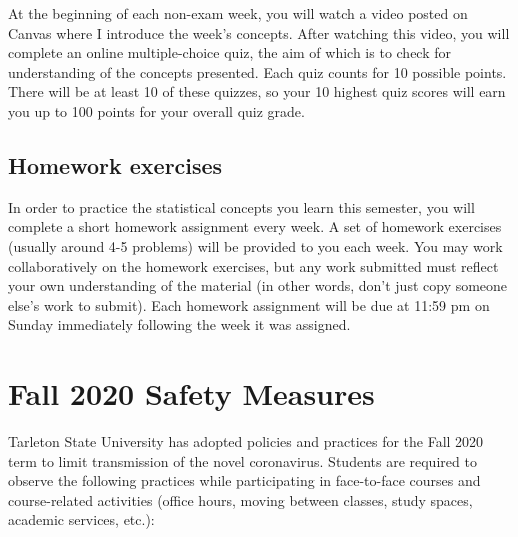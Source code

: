 \documentclass[10pt]{article}
\begin{document}
At the beginning of each non-exam week, you will watch a video posted on Canvas where I introduce the week's concepts. After watching this video, you will complete an online multiple-choice quiz, the aim of which is to check for understanding of the concepts presented. Each quiz counts for 10 possible points. There will be at least 10 of these quizzes, so your 10 highest quiz scores will earn you up to 100 points for your overall quiz grade.

\subsection*{Homework exercises}
\label{sec:orgb65e7b1}
In order to practice the statistical concepts you learn this semester, you will complete a short homework assignment every week. A set of homework exercises (usually around 4-5 problems) will be provided to you each week. You may work collaboratively on the homework exercises, but any work submitted must reflect your own understanding of the material (in other words, don't just copy someone else's work to submit).  Each homework assignment will be due at 11:59 pm on Sunday immediately following the week it was assigned.

\section*{Fall 2020 Safety Measures}
\label{sec:orge9e06cd}
Tarleton State University has adopted policies and practices for the Fall 2020 term to limit transmission of the novel coronavirus. Students are required to observe the following practices while participating in face-to-face courses and course-related activities (office hours, moving between classes, study spaces, academic services, etc.):
\end{document}
